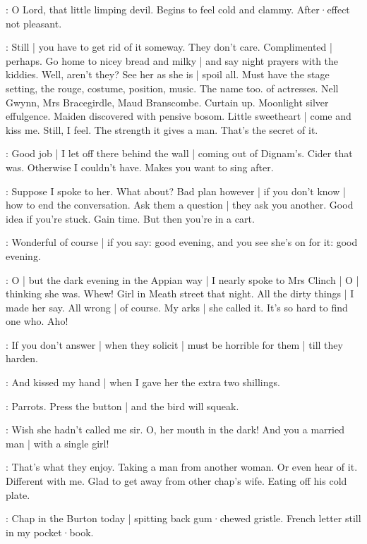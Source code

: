 \BloomCurrent:
O Lord,
that little limping devil.
Begins to feel cold and clammy.
After·effect not pleasant.

\BloomAbstract:
Still |
you have to get rid of it someway.
They don't care.
Complimented |
perhaps.
Go home to nicey bread and milky |
and say night prayers with the kiddies.
Well,
aren't they?
See her as she is |
spoil all.
Must have the stage setting,
the rouge,
costume,
position,
music.
The name too.
 of actresses.
Nell Gwynn,
Mrs Bracegirdle,
Maud Branscombe.
Curtain up.
Moonlight silver effulgence.
Maiden discovered with pensive bosom.
Little sweetheart |
come and kiss me.
Still,
I feel.
The strength it gives a man.
That's the secret of it.%

\BloomToday:
Good job |
I let off there behind the wall |
coming out of Dignam's.
Cider that was.
Otherwise I couldn't have.
Makes you want to sing after.

\BloomCurrent:
Suppose I spoke to her.
What about?
Bad plan however |
if you don't know |
how to end the conversation.
Ask them a question |
they ask you another.
Good idea
if you're stuck.
Gain time.
But then you're in a cart.

\BloomAbstract:
Wonderful of course |
if you say:
good evening,
and you see she's on for it:
good evening.

\BloomHist:
O |
but the dark evening in the Appian way |
I nearly spoke to Mrs Clinch |
O |
thinking she was.
Whew!
Girl in Meath street that night.
All the dirty things |
I made her say.
All wrong |
of course.
My arks |
she called it.
It's so hard to find one who.
Aho!

\BloomAbstract:
If you don't answer |
when they solicit |
must be horrible for them |%
till they harden.

\BloomHist:
And kissed my hand |
when I gave her the extra two shillings.

\BloomAbstract:
Parrots.
Press the button |
and the bird will squeak.

\BloomHist:
Wish she hadn't called me sir.
O,
her mouth in the dark!
And you a married man |
with a single girl!

\BloomAbstract:
That's what they enjoy.
Taking a man from another woman.
Or even hear of it.
Different with me.
Glad to get away from other chap's wife.
Eating off his cold plate.

\BloomToday:
Chap in the Burton today |
spitting back gum·chewed gristle.
French letter still in my pocket·book.

